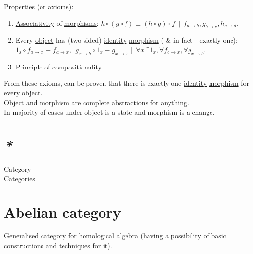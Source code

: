 \documentclass[a4paper,14pt,oneside]{book}
\begin{document}
\hyperref[orge2c24e7]{Properties} (or axioms):\\
\begin{enumerate}
\item \hyperref[org90e46c2]{Associativity} of \hyperref[org801ca09]{morphisms}: \({h} \circ ({g} \circ {f}) \equiv ({h} \circ {g}) \circ {f} \ \ | \ \ {f}_{a \to b}, {g}_{b \to c}, {h}_{c \to d}\).\\
\item Every \hyperref[org920c789]{object} has (two-sided) \hyperref[org79eeec1]{identity} \hyperref[orga7d420f]{morphism} ( \& in fact - exactly one): \({1}_x \circ {f}_{a \to x} \equiv {f}_{a \to x}, \ \ {g}_{x \to b} \circ {1_x} \equiv {g}_{x \to b } \ \ | \ \ \forall x \ \exists {1}_{x}, \forall {f}_{a \to x},  \forall {g}_{x \to b}\).\\
\item Principle of \hyperref[org88ac17c]{compositionality}.\\
\end{enumerate}

From these axioms, can be proven that there is exactly one \hyperref[org79eeec1]{identity} \hyperref[orga7d420f]{morphism} for every \hyperref[org920c789]{object}.\\

\hyperref[org920c789]{Object} and \hyperref[orga7d420f]{morphism} are complete \hyperref[org0f25814]{abstractions} for anything.\\
In majority of cases under \hyperref[org920c789]{object} is a state and \hyperref[orga7d420f]{morphism} is a change.\\

\section{\emph{*}}
\label{sec:org2ddaa42}

\label{org74d6ac5}Category\\
\label{org41a3e52}Categories\\

\section{\label{org11a0cc9}Abelian category}
\label{sec:orgd8ee489}
Generalised \hyperref[org74d6ac5]{category} for homological \hyperref[orga3cc81c]{algebra} (having a possibility of basic constructions and techniques for it).\\
\end{document}

